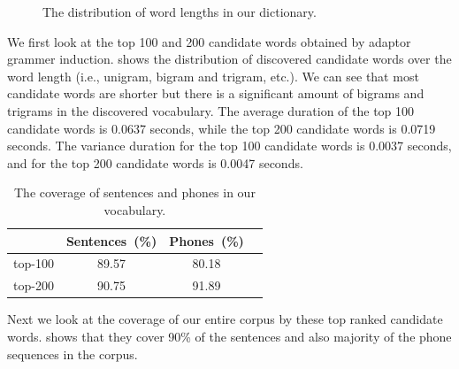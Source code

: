 %
%
%
%
\begin{figure}[th]
	\centering
		\caption{The distribution of word lengths in our dictionary.} 
		\label{fig:wordGram}
\end{figure}
We first look at the top 100 and 200 candidate words obtained by adaptor grammer induction. 
 shows the distribution of discovered candidate words over the word length (i.e., unigram, bigram and trigram, etc.). We can see that most candidate
words are shorter but there is a significant amount of bigrams and trigrams in the discovered vocabulary. The average duration of the top 100 candidate words is 0.0637 seconds, while the top 200 candidate words is 0.0719 seconds. The variance duration for the top 100 candidate words is 0.0037 seconds, and for the top 200 candidate words is 0.0047 seconds.

\begin{table}[th]
	\centering
	\small
	\begin{tabular}{lccc}
		\hline
		\textbf{} & \textbf{Sentences~(\%)} & \textbf{Phones~(\%)}\\
		\hline
		top-100 & 89.57 & 80.18 \\
		top-200 & 90.75 & 91.89 \\\hline
	\end{tabular}
	\caption{The coverage of sentences and phones in our vocabulary.}
	\label{tab:wordStats}
\end{table}
Next we look at the coverage of our entire corpus by these top ranked candidate words.
 shows that they cover 90\% of the sentences and also majority
of the phone sequences in the corpus. 

